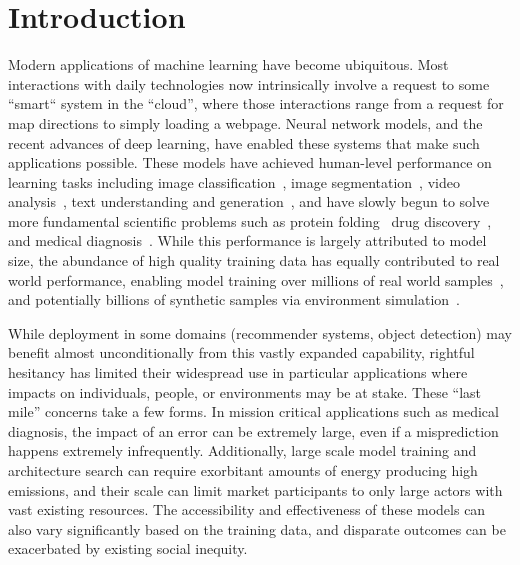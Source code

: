 \chapter{Introduction} \label{chap:intro} 

Modern applications of machine learning have become ubiquitous.
Most interactions with daily technologies now intrinsically involve 
a request to some ``smart`` system in the ``cloud'', 
where those interactions range from
a request for map directions 
to simply loading a webpage.
Neural network models, and the recent advances of deep learning,
have enabled these systems that 
make such applications possible.
These models have achieved
human-level performance on learning tasks
including image classification~\citep{resnet,alexnet}, image segmentation~\citep{segmentation}, video analysis~\citep{zhang2016video}, text understanding and generation~\citep{bert,gpt}, and have slowly begun to solve more fundamental scientific problems such as protein folding~\citep{protein} drug discovery~\citep{drugdisc}, and medical diagnosis~\citep{diag}.
While this performance is largely attributed to model size,
the abundance of high quality training data
has equally contributed to real world performance,
enabling model training over millions of real world samples~\citep{imagenet,laion},
and potentially billions of synthetic samples via environment simulation~\citep{mcts}.

While deployment in some domains (recommender systems, object detection) may benefit almost unconditionally from this vastly expanded capability, rightful hesitancy has limited their widespread use in particular applications where impacts on individuals, people, or environments may be at stake.
These ``last mile'' concerns take a few forms.
In mission critical applications such as medical diagnosis, 
the impact of an error can be extremely large,
even if a misprediction happens extremely infrequently.
Additionally, large scale model training and architecture search
can require exorbitant amounts of energy producing high emissions,
and their scale can limit market participants
to only large actors with vast existing resources.
The accessibility and effectiveness of these models can also vary significantly based on the training data, and disparate outcomes can be exacerbated by existing social inequity.

